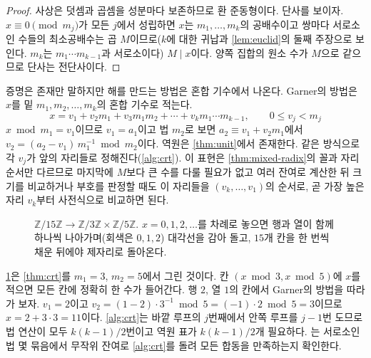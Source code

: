 \begin{proof}
사상은 덧셈과 곱셈을 성분마다 보존하므로 환 준동형이다. 단사를 보이자. $x\equiv0\pmod{m_j}$가 모든 $j$에서 성립하면 $x$는 $m_1,\dots,m_k$의 공배수이고 쌍마다 서로소인 수들의 최소공배수는 곱 $M$이므로($k$에 대한 귀납과 \cref{lem:euclid}의 둘째 주장으로 보인다. $m_k$는 $m_1\cdots m_{k-1}$과 서로소이다) $M\mid x$이다. 양쪽 집합의 원소 수가 $M$으로 같으므로 단사는 전단사이다.
\end{proof}

증명은 존재만 말하지만 해를 만드는 방법은 혼합 기수에서 나온다. Garner의 방법은 $x$를 밑 $m_1,m_2,\dots,m_k$의 혼합 기수로 적는다.
\[
x=v_1+v_2m_1+v_3m_1m_2+\cdots+v_km_1\cdots m_{k-1},\qquad0\le v_j<m_j
\]
$x\bmod m_1=v_1$이므로 $v_1=a_1$이고 법 $m_2$로 보면 $a_2\equiv v_1+v_2m_1$에서 $v_2=(a_2-v_1)\,m_1^{-1}\bmod m_2$이다. 역원은 \cref{thm:unit}에서 존재한다. 같은 방식으로 각 $v_j$가 앞의 자리들로 정해진다(\cref{alg:crt}). 이 표현은 \cref{thm:mixed-radix}의 꼴과 자리 순서만 다르므로 마지막에 $M$보다 큰 수를 다룰 필요가 없고 여러 잔여로 계산한 뒤 크기를 비교하거나 부호를 판정할 때도 이 자리들을 $(v_k,\dots,v_1)$의 순서로, 곧 가장 높은 자리 $v_k$부터 사전식으로 비교하면 된다.

\begin{figure}[htbp]
\centering
{}
\caption{$\mathbb{Z}/15\mathbb{Z}\to\mathbb{Z}/3\mathbb{Z}\times\mathbb{Z}/5\mathbb{Z}$. $x=0,1,2,\dots$를 차례로 놓으면 행과 열이 함께 하나씩 나아가며(회색은 $0,1,2$) 대각선을 감아 돌고, $15$개 칸을 한 번씩 채운 뒤에야 제자리로 돌아온다.}
\label{fig:crt-grid}
\end{figure}

\cref{fig:crt-grid}은 \cref{thm:crt}를 $m_1=3$, $m_2=5$에서 그린 것이다. 칸 $(x\bmod3,x\bmod5)$에 $x$를 적으면 모든 칸에 정확히 한 수가 들어간다. 행 $2$, 열 $1$의 칸에서 Garner의 방법을 따라가 보자. $v_1=2$이고 $v_2=(1-2)\cdot3^{-1}\bmod5=(-1)\cdot2\bmod5=3$이므로 $x=2+3\cdot3=11$이다. \cref{alg:crt}는 바깥 루프의 $j$번째에서 안쪽 루프를 $j-1$번 도므로 법 연산이 모두 $k(k-1)/2$번이고 역원 표가 $k(k-1)/2$개 필요하다. 는 서로소인 법 몇 묶음에서 무작위 잔여로 \cref{alg:crt}를 돌려 모든 합동을 만족하는지 확인한다.

